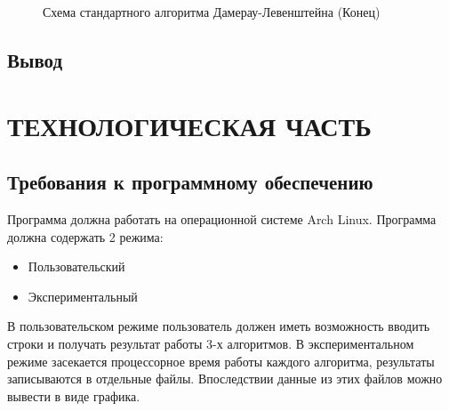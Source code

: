 \documentclass[a4paper,12pt]{article}
\begin{document}
\begin{figure}[p]
\caption{Схема стандартного алгоритма Дамерау-Левенштейна (Конец)}
\label{images:damerau_levenstein2}
\end{figure}

\newpage
\subsection{Вывод}


\newpage
\section{ТЕХНОЛОГИЧЕСКАЯ ЧАСТЬ}
\subsection{Требования к программному обеспечению}

\begin{flushleft}
Программа должна работать на операционной системе Arch Linux. Программа должна
содержать 2 режима:
\begin{itemize}
\item Пользовательский
\item Экспериментальный
\end{itemize}
В пользовательском режиме пользователь должен иметь возможность вводить строки и получать результат работы 3-х алгоритмов. В экспериментальном режиме засекается процессорное время работы каждого алгоритма, результаты записываются в отдельные файлы. Впоследствии данные из этих файлов можно вывести в виде графика.
\end{flushleft}
\end{document}
